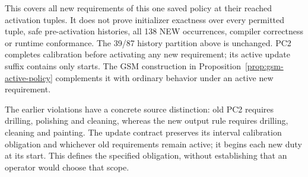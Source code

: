 This covers all new requirements of this one saved policy at their reached activation tuples. It does not prove initializer exactness over every permitted tuple, safe pre-activation histories, all 138 NEW occurrences, compiler correctness or runtime conformance. The 39/87 history partition above is unchanged. PC2 completes calibration before activating any new requirement; its active update suffix contains only starts. The GSM construction in Proposition~\ref{prop:gsm-active-policy} complements it with ordinary behavior under an active new requirement.

The earlier violations have a concrete source distinction: old PC2 requires drilling, polishing and cleaning, whereas the new output rule requires drilling, cleaning and painting. The update contract preserves its interval calibration obligation and whichever old requirements remain active; it begins each new duty at its start. This defines the specified obligation, without establishing that an operator would choose that scope.
